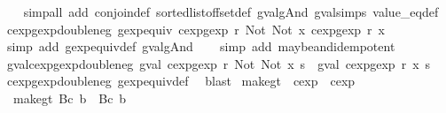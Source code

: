 \begin{isabellebody}
\ \ \isamarkupfalse%
\ {\isacharparenleft}simp{\isacharunderscore}all\ add{\isacharcolon}\ conjoin{\isacharunderscore}def\ sorted{\isacharunderscore}list{\isacharunderscore}of{\isacharunderscore}fset{\isacharunderscore}def\ gval{\isacharunderscore}gAnd\ gval{\isachardot}simps\ value_eq{\isacharunderscore}def{\isacharparenright}%
\endisatagproof
{\isafoldproof}%
%
\isadelimproof
\isanewline
%
\endisadelimproof
\isanewline
{}\isamarkupfalse%
\ cexp{}gexp{\isacharunderscore}double{\isacharunderscore}neg{\isacharcolon}\ {\isachardoublequoteopen}gexp{\isacharunderscore}equiv\ {\isacharparenleft}cexp{}gexp\ r\ {\isacharparenleft}Not\ {\isacharparenleft}Not\ x{\isacharparenright}{\isacharparenright}{\isacharparenright}\ {\isacharparenleft}cexp{}gexp\ r\ x{\isacharparenright}{\isachardoublequoteclose}\isanewline
%
\isadelimproof
\ \ %
\endisadelimproof
%
\isatagproof
{}\isamarkupfalse%
\ {\isacharparenleft}simp\ add{\isacharcolon}\ gexp{\isacharunderscore}equiv{\isacharunderscore}def\ gval{\isacharunderscore}gAnd{\isacharparenright}\isanewline
\ \ \isamarkupfalse%
\ {\isacharparenleft}simp\ add{\isacharcolon}\ maybe{\isacharunderscore}and{\isacharunderscore}idempotent{\isacharparenright}%
\endisatagproof
{\isafoldproof}%
%
\isadelimproof
\isanewline
%
\endisadelimproof
\isanewline
{}\isamarkupfalse%
\ gval{\isacharunderscore}cexp{}gexp{\isacharunderscore}double{\isacharunderscore}neg{\isacharcolon}\ {\isachardoublequoteopen}gval\ {\isacharparenleft}cexp{}gexp\ r\ {\isacharparenleft}Not\ {\isacharparenleft}Not\ x{\isacharparenright}{\isacharparenright}{\isacharparenright}\ s\ {\isacharequal}\ gval\ {\isacharparenleft}cexp{}gexp\ r\ x{\isacharparenright}\ s{\isachardoublequoteclose}\isanewline
%
\isadelimproof
\ \ %
\endisadelimproof
%
\isatagproof
{}\isamarkupfalse%
\ cexp{}gexp{\isacharunderscore}double{\isacharunderscore}neg\ gexp{\isacharunderscore}equiv{\isacharunderscore}def\ \isamarkupfalse%
\ blast%
\endisatagproof
{\isafoldproof}%
%
\isadelimproof
\isanewline
%
\endisadelimproof
\isanewline
{}\isamarkupfalse%
\ make{\isacharunderscore}gt\ {\isacharcolon}{\isacharcolon}\ {\isachardoublequoteopen}cexp\ {\isasymRightarrow}\ cexp{\isachardoublequoteclose}\ \isanewline
\ \ {\isachardoublequoteopen}make{\isacharunderscore}gt\ {\isacharparenleft}Bc\ b{\isacharparenright}\ {\isacharequal}\ Bc\ b{\isachardoublequoteclose}\ {\isacharbar}\isanewline

\end{isabellebody}
